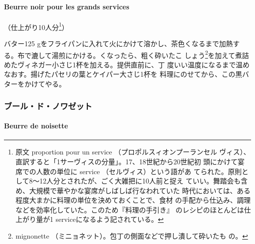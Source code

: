 \begin{recette}
\hypertarget{beurre-noir-pour-les-grands-services}{%
\paragraph{Beurre noir pour les grands
services}\label{beurre-noir-pour-les-grands-services}}


（仕上がり10人分\footnote{原文 proportion pour un service
  （プロポルスィオンプーランセル
  ヴィス）、直訳すると「1サーヴィスの分量」。17、18世紀から20世紀初
  頭にかけて宴席での人数の単位に service （セルヴィス）という語があ
  てられた。原則として8〜12人分とされたが、ごく大雑把に10人前と捉え
  ていい。舞踏会も含め、大規模で華やかな宴席がしばしば行なわれていた
  時代においては、ある程度大まかに料理の単位を決めておくことで、食材
  の手配から仕込み、調理などを効率化していた。このため『料理の手引き』
  のレシピのほとんどは仕上がり量が1 serviceになるよう記されている。}）

バター125 gをフライパンに入れて火にかけて溶かし、茶色くなるまで加熱す
る。布で漉して湯煎にかける。くなったら、粗く砕いたこ
しょう\footnote{mignonette
  （ミニョネット）。包丁の側面などで押し潰して砕いたも の。}を加えて煮詰めたヴィネガー小さじ1杯を加える。提供直前に、丁
度いい温度になるまで温めなおす。揚げたパセリの葉とケイパー大さじ1杯を
料理にのせてから、この黒バターをかけてやる。

\maeaki

\hypertarget{ux30d6ux30fcux30ebux30c9ux30ceux30efux30bcux30c3ux30c8}{%
\subsubsection{ブール・ド・ノワゼット}\label{ux30d6ux30fcux30ebux30c9ux30ceux30efux30bcux30c3ux30c8}}

\hypertarget{beurre-de-noisette}{%
\paragraph{Beurre de noisette}\label{beurre-de-noisette}}



\end{recette}
